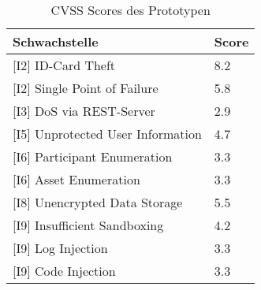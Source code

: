     	\begin{table}[H]
            \centering
            \begin{tabular}{|l|l|}
            \hline
\textbf{Schwachstelle}                & \textbf{Score} \\ \hline
\rowcolor{light-gray}
{[}I2{]} ID-Card Theft                & \cellcolor{redorange}8.2            \\ \hline
{[}I2{]} Single Point of Failure      & \cellcolor{orange}5.8            \\ \hline
\rowcolor{light-gray}
{[}I3{]} DoS via REST-Server          & \cellcolor{yellow}2.9            \\ \hline
{[}I5{]} Unprotected User Information & \cellcolor{orange}4.7            \\ \hline
\rowcolor{light-gray}
{[}I6{]} Participant Enumeration      & \cellcolor{yellow}3.3            \\ \hline
{[}I6{]} Asset Enumeration            & \cellcolor{yellow}3.3            \\ \hline
\rowcolor{light-gray}
{[}I8{]} Unencrypted Data Storage     & \cellcolor{orange}5.5            \\ \hline
{[}I9{]} Insufficient Sandboxing      & \cellcolor{orange}4.2            \\ \hline
\rowcolor{light-gray}
{[}I9{]} Log Injection                & \cellcolor{yellow}3.3            \\ \hline
{[}I9{]} Code Injection               & \cellcolor{yellow}3.3            \\ \hline
            \end{tabular}
            \caption[CVSS Scores des Prototypen]{CVSS Scores des Prototypen}
            \label{tab:eval_cvss_short}
        \end{table}
